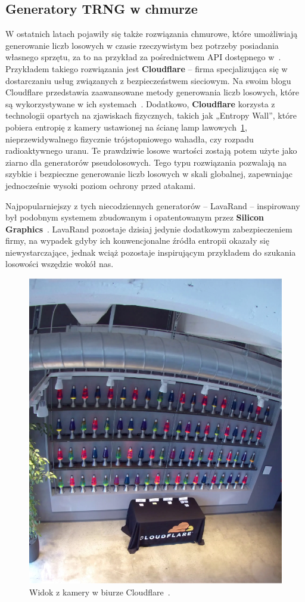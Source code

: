 \subsection{Generatory TRNG w chmurze}\label{subsec:generatory-trng-w-chmurze}

W ostatnich latach pojawiły się także rozwiązania chmurowe, które umożliwiają generowanie liczb losowych w czasie rzeczywistym bez potrzeby posiadania własnego sprzętu,
za to na przykład za pośrednictwem API dostępnego w~\cite{drand_documentation}.
Przykładem takiego rozwiązania jest \textbf{Cloudflare} – firma specjalizująca się w dostarczaniu usług związanych z bezpieczeństwem sieciowym.
Na swoim blogu Cloudflare przedstawia zaawansowane metody generowania liczb losowych, które są wykorzystywane w ich systemach~\cite{cloudflare_league_of_entropy}.
Dodatkowo, \textbf{Cloudflare} korzysta z technologii opartych na zjawiskach fizycznych, takich jak „Entropy Wall”, które pobiera entropię z kamery
ustawionej na ścianę lamp lawowych~\ref{fig:lavarand}, nieprzewidywalnego fizycznie trójstopniowego wahadła, czy rozpadu radioaktywnego uranu.
Te prawdziwie losowe wartości zostają potem użyte jako ziarno dla generatorów pseudolosowych.
Tego typu rozwiązania pozwalają na szybkie i bezpieczne generowanie liczb losowych w skali globalnej, zapewniając jednocześnie wysoki poziom ochrony przed atakami.

Najpopularniejszy z tych niecodziennych generatorów -- LavaRand -- inspirowany był podobnym systemem zbudowanym i
opatentowanym przez \textbf{Silicon Graphics}~\cite{SiliconGraphics}.
LavaRand pozostaje dzisiaj jedynie dodatkowym zabezpieczeniem firmy,
na wypadek gdyby ich konwencjonalne źródła entropii okazały się niewystarczające,
jednak wciąż pozostaje inspirującym przykładem do szukania losowości wszędzie wokół nas.

\begin{figure}[H]
    \centering
    \includegraphics[width=0.4\linewidth]{chapters/02-teoria/figures/lavarandCamera}
    \caption{Widok z kamery w biurze Cloudflare~\cite{cloudflare_lavarand}.}
    \label{fig:lavarand}
\end{figure}


